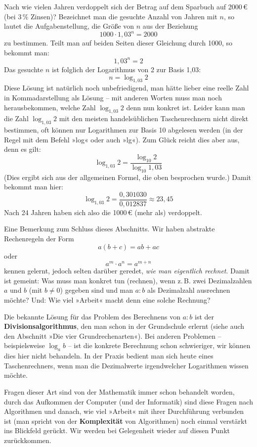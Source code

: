 Nach wie vielen Jahren verdoppelt sich der Betrag auf dem Sparbuch auf 2000\,€ (bei 3\,\% Zinsen)? Bezeichnet man die gesuchte Anzahl von Jahren mit $n$, so lautet die Aufgabenstellung, die Größe von $n$ aus der Beziehung
\[ 1000 \cdot 1{,}03^n = 2000 \]
zu bestimmen. Teilt man auf beiden Seiten dieser Gleichung durch 1000, so bekommt man:
\[ 1{,}03^n = 2 \]
Das gesuchte $n$ ist folglich der Logarithmus von 2 zur Basis 1{,}03:
\[ n = \log_{1{,}03} 2 \]
Diese Lösung ist natürlich noch unbefriedigend, man hätte lieber eine reelle Zahl in Kommadarstellung als Lösung -- mit anderen Worten muss man noch herausbekommen, welche Zahl $\log_{1{,}03} 2$ denn nun konkret ist. Leider kann man die Zahl $\log_{1{,}03} 2$ mit den meisten handelsüblichen Taschenrechnern nicht direkt bestimmen, oft können nur Logarithmen zur Basis 10 abgelesen werden (in der Regel mit dem Befehl »log« oder auch »lg«). Zum Glück reicht dies aber aus, denn es gilt:
\[ \log_{1{,}03} 2 = \frac{\log_{10} 2}{\log_{10} 1{,}03} \]
(Dies ergibt sich aus der allgemeinen Formel, die oben besprochen wurde.) Damit bekommt man hier:
\[ \log_{1{,}03} 2 = \frac{0{,}301030}{0{,}012837} \approx 23{,}45 \]
Nach 24 Jahren haben sich also die 1000\,€ (mehr als) verdoppelt.\beispielende

Eine Bemerkung zum Schluss dieses Abschnitts. Wir haben abstrakte Rechenregeln der Form
\[ a(b+c) = ab + ac \]
oder
\[ a^m \cdot a^n = a^{m+n} \]
kennen gelernt, jedoch selten darüber geredet, \emph{wie man eigentlich rechnet}. Damit ist gemeint: Was muss man konkret tun (rechnen), wenn z.\,B. zwei Dezimalzahlen $a$ und $b$ (mit $b \neq 0$) gegeben sind und man $a:b$ als Dezimalzahl ausrechnen möchte? Und: Wie viel »Arbeit« macht denn eine solche Rechnung?

Die bekannte Lösung für das Problem des Berechnens von $a:b$ ist der \textbf{Divisionsalgorithmus}, den man schon in der Grundschule erlernt (siehe auch den Abschnitt »Die vier Grundrechenarten«). Bei anderen Problemen -- beispielsweise $\log_a b$ -- ist die konkrete Berechnung schon schwieriger, wir können dies hier nicht behandeln. In der Praxis bedient man sich heute eines Taschenrechners, wenn man die Dezimalwerte irgendwelcher Logarithmen wissen möchte.

Fragen dieser Art sind von der Mathematik immer schon behandelt worden, durch das Aufkommen der Computer (und der Informatik) sind diese Fragen nach Algorithmen und danach, wie viel »Arbeit« mit ihrer Durchführung verbunden ist (man spricht von der \textbf{Komplexität} von Algorithmen) noch einmal verstärkt ins Blickfeld gerückt. Wir werden bei Gelegenheit wieder auf diesen Punkt zurückkommen.

